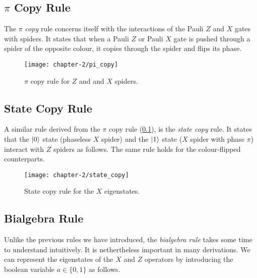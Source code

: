 

\subsection{$\pi$ Copy Rule}%
\label{pi-copy}

The $\pi$ \textit{copy} rule concerns itself with the interactions of the Pauli $Z$ and $X$ gates with spiders. It states that when a Pauli $Z$ or Pauli $X$ gate is pushed through a spider of the opposite colour, it copies through the spider and flips its phase.

\begin{figure}[H]
    \centering
    \texttt{[image: chapter-2/pi\_copy]}
    \caption{$\pi$ copy rule for $Z$ and and $X$ spiders.}
\end{figure}


\subsection{State Copy Rule}%
\label{state-copy}

A similar rule derived from the $\pi$ copy rule (\ref{pi-copy}), is the \textit{state copy} rule. It states that the $\ket 0$ state (phaseless $X$ spider) and the $\ket 1$ state ($X$ spider with phase $\pi$) interact with $Z$ spiders as follows. The same rule holds for the colour-flipped counterparts.

\begin{figure}[H]
    \centering
    \texttt{[image: chapter-2/state\_copy]}
    \caption{State copy rule for the $X$ eigenstates.}
\end{figure}


\subsection{Bialgebra Rule}%
\label{bialgebra}
Unlike the previous rules we have introduced, the \textit{bialgebra rule} takes some time to understand intuitively. It is nethertheless important in many derivations. We can represent the eigenstates of the $X$ and $Z$ operators by introducing the boolean variable $a \in \{0, 1\}$ as follows.


